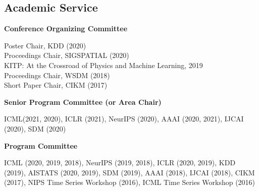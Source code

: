 \documentclass[margin,line]{res}
\begin{document}
\begin{resume}
\section{\sc Academic Service}
%
%
%
%
{\bf Conference Organizing Committee}

Poster Chair, KDD (2020) \\
Proceedings Chair, SIGSPATIAL (2020) \\
KITP: At the Crossroad of Physics and Machine Learning,  2019\\
Proceedings Chair, WSDM (2018)\\
Short Paper Chair, CIKM (2017)

%



{\bf Senior Program Committee (or Area Chair)}

ICML(2021, 2020), ICLR (2021),  NeurIPS (2020), AAAI (2020, 2021), IJCAI (2020), SDM (2020)

{\bf Program Committee}

ICML (2020, 2019, 2018), NeurIPS (2019, 2018), ICLR (2020, 2019), KDD (2019), AISTATS (2020, 2019), SDM (2019), AAAI (2018), IJCAI (2018), CIKM (2017), NIPS Time Series Workshop (2016), ICML Time Series Workshop (2016) 
%
%
%





\end{resume}
\end{document}
